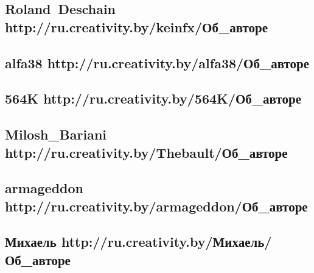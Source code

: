\subsection*{Roland~Deschain \hfill  
\tiny{http://ru.creativity.by/keinfx/Об\_авторе}}

\subsection*{alfa38 \hfill  
\tiny{http://ru.creativity.by/alfa38/Об\_авторе}}

\subsection*{564K \hfill  
\tiny{http://ru.creativity.by/564K/Об\_авторе}}

\subsection*{Milosh\_Bariani \hfill  
\tiny{http://ru.creativity.by/Thebault/Об\_авторе}}

\subsection*{armageddon \hfill  
\tiny{http://ru.creativity.by/armageddon/Об\_авторе}}

\subsection*{Михаель \hfill  
\tiny{http://ru.creativity.by/Михаель/Об\_авторе}}